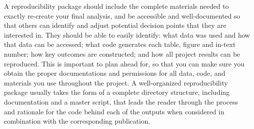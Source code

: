 \documentclass[
]{book}
\begin{document}
A reproducibility package should include the complete materials needed
to exactly re-create your final analysis,
and be accessible and well-documented so that others can identify
and adjust potential decision points that they are interested in.
They should be able to easily identify:
what data was used and how that data can be accessed;
what code generates each table, figure and in-text number;
how key outcomes are constructed;
and how all project results can be reproduced.
This is important to plan ahead for,
so that you can make sure you obtain the proper
documentations and permissions
for all data, code, and materials you use throughout the project.
A well-organized reproducibility package usually takes the form
of a complete directory structure, including documentation and a master script,
that leads the reader through the process and rationale
for the code behind each of the outputs
when considered in combination with the corresponding publication.
\end{document}
